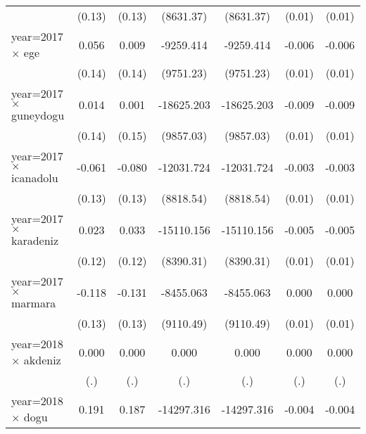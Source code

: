 {\begin{tabular}{l*{6}{c}}
                    &      (0.13)         &      (0.13)         &   (8631.37)         &   (8631.37)         &      (0.01)         &      (0.01)         \\
year=2017 $\times$ ege&       0.056         &       0.009         &   -9259.414         &   -9259.414         &      -0.006         &      -0.006         \\
                    &      (0.14)         &      (0.14)         &   (9751.23)         &   (9751.23)         &      (0.01)         &      (0.01)         \\
year=2017 $\times$ guneydogu&       0.014         &       0.001         &  -18625.203         &  -18625.203         &      -0.009         &      -0.009         \\
                    &      (0.14)         &      (0.15)         &   (9857.03)         &   (9857.03)         &      (0.01)         &      (0.01)         \\
year=2017 $\times$ icanadolu&      -0.061         &      -0.080         &  -12031.724         &  -12031.724         &      -0.003         &      -0.003         \\
                    &      (0.13)         &      (0.13)         &   (8818.54)         &   (8818.54)         &      (0.01)         &      (0.01)         \\
year=2017 $\times$ karadeniz&       0.023         &       0.033         &  -15110.156         &  -15110.156         &      -0.005         &      -0.005         \\
                    &      (0.12)         &      (0.12)         &   (8390.31)         &   (8390.31)         &      (0.01)         &      (0.01)         \\
year=2017 $\times$ marmara&      -0.118         &      -0.131         &   -8455.063         &   -8455.063         &       0.000         &       0.000         \\
                    &      (0.13)         &      (0.13)         &   (9110.49)         &   (9110.49)         &      (0.01)         &      (0.01)         \\
year=2018 $\times$ akdeniz&       0.000         &       0.000         &       0.000         &       0.000         &       0.000         &       0.000         \\
                    &         (.)         &         (.)         &         (.)         &         (.)         &         (.)         &         (.)         \\
year=2018 $\times$ dogu&       0.191         &       0.187         &  -14297.316         &  -14297.316         &      -0.004         &      -0.004         \\

\end{tabular}}
